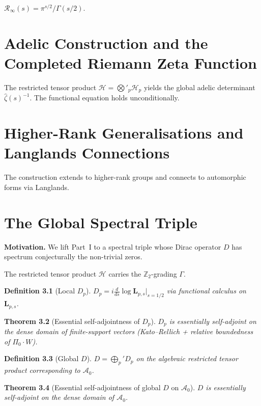 \documentclass[11pt, oneside]{book}
\newtheorem{theorem}{Theorem}[chapter]
\newtheorem{definition}[theorem]{Definition}
\begin{document}
\(\mathcal{R}_\infty(s)=\pi^{s/2}/\Gamma(s/2)\).

\chapter{Adelic Construction and the Completed Riemann Zeta Function}
\label{ch:adelic}

The restricted tensor product \(\mathcal{H}=\bigotimes'_p\mathcal{H}_p\) yields the global adelic determinant \(\hat{\zeta}(s)^{-1}\). The functional equation holds unconditionally.

\chapter{Higher-Rank Generalisations and Langlands Connections}
\label{ch:higherrank}

The construction extends to higher-rank groups and connects to automorphic forms via Langlands.

\chapter{The Global Spectral Triple}
\label{ch:global-triple}

\textbf{Motivation.} We lift Part~I to a spectral triple whose Dirac operator \(D\) has spectrum conjecturally the non-trivial zeros.

The restricted tensor product \(\mathcal{H}\) carries the \(\mathbb{Z}_2\)-grading \(\Gamma\).

\begin{definition}[Local \(D_p\)]
\(D_p = i \frac{d}{ds} \log \mathbf{L}_{p,s}\big|_{s=1/2}\) via functional calculus on \(\mathbf{L}_{p,s}\).
\end{definition}

\begin{theorem}[Essential self-adjointness of \(D_p\)]
\(D_p\) is essentially self-adjoint on the dense domain of finite-support vectors (Kato--Rellich + relative boundedness of \(\Pi_0\cdot W\)).
\end{theorem}

\begin{definition}[Global \(D\)]
\(D = \bigoplus_p' D_p\) on the algebraic restricted tensor product corresponding to \(\mathcal{A}_0\).
\end{definition}

\begin{theorem}[Essential self-adjointness of global \(D\) on \(\mathcal{A}_0\)]
\(D\) is essentially self-adjoint on the dense domain of \(\mathcal{A}_0\).
\end{theorem}
\end{document}
